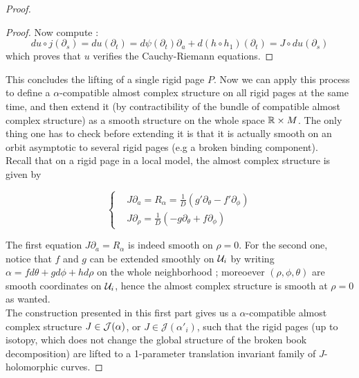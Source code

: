 \documentclass[../main.tex]{subfiles}
\begin{document}
\begin{proof}
\begin{proof}
Now compute :
$$du\circ j(\partial_s) = du(\partial_t) = d\psi(\partial_t)\partial_a + d(h\circ h_1)(\partial_t) = J\circ du(\partial_s)$$
which proves that $u$ verifies the Cauchy-Riemann equations.

\end{proof}

This concludes the lifting of a single rigid page $P$. Now we can apply this process to define a $\alpha$-compatible almost complex structure on all rigid pages at the same time, and then extend it (by contractibility of the bundle of compatible almost complex structure) as a smooth structure on the whole space $\mathbb{R}\times M$. The only thing one has to check before extending it is that it is actually smooth on an orbit asymptotic to several rigid pages (e.g a broken binding component). \\

Recall that on a rigid page in a local model, the almost complex structure is given by 

$$\left\{
    \begin{array}{ll}
        & J\partial_a = R_\alpha= \frac{1}{D}(g'\partial_\theta - f'\partial_\phi) \\
        & J\partial_\rho = \frac{1}{D}(-g\partial_\theta + f\partial_\phi) 
    \end{array}
\right.$$

The first equation $J\partial_a = R_\alpha$ is indeed smooth on $\rho = 0$. For the second one, notice that $f$ and $g$ can be extended smoothly on $\mathcal{U}_i$ by writing $\alpha = fd\theta + gd\phi + hd\rho$ on the whole neighborhood ; moreoever $(\rho,\phi,\theta)$ are smooth coordinates on $\mathcal{U}_i$, hence the almost complex structure is smooth at $\rho = 0$ as wanted. \\

The construction presented in this first part gives us a $\alpha$-compatible almost complex structure $J\in\mathcal{J}(\alpha)$, or $J\in \mathcal{J}(\alpha'_i)$, such that the rigid pages (up to isotopy, which does not change the global structure of the broken book decomposition) are lifted to a 1-parameter translation invariant family of $J$-holomorphic curves. 



\end{proof}
\end{document}
